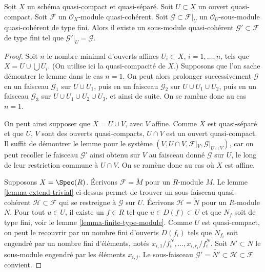 \begin{lemma}
\label{lemma-extend}
Soit $X$ un schéma quasi-compact et quasi-séparé.
Soit $U \subset X$ un ouvert quasi-compact.
Soit $\mathcal{F}$ un $\mathcal{O}_X$-module
quasi-cohérent. Soit $\mathcal{G} \subset \mathcal{F}|_U$ un
$\mathcal{O}_U$-sous-module quasi-cohérent de type fini.
Alors il existe un sous-module quasi-cohérent $\mathcal{G}' \subset \mathcal{F}$
de type fini tel que $\mathcal{G}'|_U = \mathcal{G}$.
\end{lemma}

\begin{proof}
Soit $n$ le nombre minimal d'ouverts affines $U_i \subset X$,
$i = 1, \ldots, n$, tels que $X = U \cup \bigcup U_i$.
(On utilise ici la quasi-compacité de $X$.) Supposons que l'on
sache démontrer le lemme dans le cas $n = 1$. On peut alors prolonger
successivement $\mathcal{G}$
en un faisceau $\mathcal{G}_1$ sur $U \cup U_1$,
puis en un faisceau $\mathcal{G}_2$ sur $U \cup U_1 \cup U_2$,
puis en un faisceau $\mathcal{G}_3$ sur $U \cup U_1 \cup U_2 \cup U_3$,
et ainsi de
suite. On se ramène donc au cas $n = 1$.

\medskip\noindent
On peut ainsi supposer que $X = U \cup V$, avec $V$ affine.
Comme $X$ est quasi-séparé et que $U$, $V$ sont des ouverts
quasi-compacts, $U \cap V$ est un ouvert quasi-compact. Il suffit de démontrer le
lemme pour le système $(V, U \cap V, \mathcal{F}|_V, \mathcal{G}|_{U \cap V})$,
car on peut recoller le faisceau $\mathcal{G}'$ ainsi obtenu sur $V$
au faisceau donné $\mathcal{G}$ sur $U$, le long de leur restriction
commune à $U \cap V$.
On se ramène donc au cas où $X$ est affine.

\medskip\noindent
Supposons $X = \Spec(R)$. Écrivons $\mathcal{F} = \widetilde M$
pour un $R$-module $M$. Le lemme \ref{lemma-extend-trivial} ci-dessus permet
de trouver un sous-faisceau quasi-cohérent $\mathcal{H} \subset \mathcal{F}$
qui se restreigne à $\mathcal{G}$ sur $U$.
Écrivons $\mathcal{H} = \widetilde N$ pour un $R$-module $N$.
Pour tout $u \in U$, il existe un $f \in R$ tel que
$u \in D(f) \subset U$ et que $N_f$ soit de type fini, voir
le lemme \ref{lemma-finite-type-module}.
Comme $U$ est quasi-compact, on peut le recouvrir par un nombre fini
d'ouverts $D(f_i)$ tels que $N_{f_i}$ soit engendré par
un nombre fini d'éléments, notés $x_{i, 1}/f_i^N, \ldots, x_{i, r_i}/f_i^N$.
Soit $N' \subset N$ le sous-module engendré par les éléments
$x_{i, j}$. Le sous-faisceau
$\mathcal{G}' = \widetilde{N'} \subset \mathcal{H} \subset \mathcal{F}$
convient.
\end{proof}

